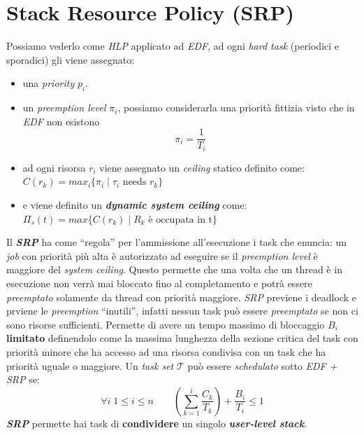 \section{Stack Resource Policy (SRP)}
Possiamo vederlo come \textit{HLP} applicato ad \textit{EDF}, ad ogni \textit{hard task} (periodici e sporadici) gli viene assegnato:
\begin{itemize}
    \item una \textit{priority} $p_i$.
    \item un \textit{preemption level} $\pi_i$, possiamo considerarla una priorità fittizia visto che in \textit{EDF} non esistono \[\pi_i = \frac{1}{T_i}\]
    \item ad ogni risorsa $r_i$ viene assegnato un \textit{ceiling} statico definito come: $C(r_k) = max_i\{\pi_i \; | \; \tau_i \text{ needs } r_k\}$
    \item e viene definito un \textbf{\textit{dynamic system ceiling}} come: $\Pi_s(t) = max\{C(r_k) \; | \; R_k \text{ è occupata in t}\}$
\end{itemize}
Il \textbf{\textit{SRP}} ha come ``regola'' per l'ammissione all'esecuzione i task che enuncia: un \textit{job} con priorità più alta è autorizzato ad eseguire se il \textit{preemption level} è maggiore del \textit{system ceiling}. Questo permette che una volta che un thread è in esecuzione non verrà mai bloccato fino al completamento e potrà essere \textit{preemptato} solamente da thread con priorità maggiore. \textit{SRP} previene i deadlock e prviene le \textit{preemption} ``inutili'', infatti nessun task può essere \textit{preemptato} se non ci sono risorse sufficienti. Permette di avere un tempo massimo di bloccaggio $B_i$ \textbf{limitato} definendolo come la massima lunghezza della sezione critica del task con priorità minore che ha accesso ad una risorsa condivisa con un task che ha priorità uguale o maggiore. Un \textit{task set} $\mathcal{T}$ può essere \textit{schedulato} sotto \textit{EDF + SRP} se: \[\forall i \; 1 \leq i \leq n \qquad (\sum_{k=1}^i \frac{C_k}{T_k}) + \frac{B_i}{T_i} \leq 1\]
\textbf{\textit{SRP}} permette hai task di \textbf{condividere} un singolo \textbf{\textit{user-level stack}}.